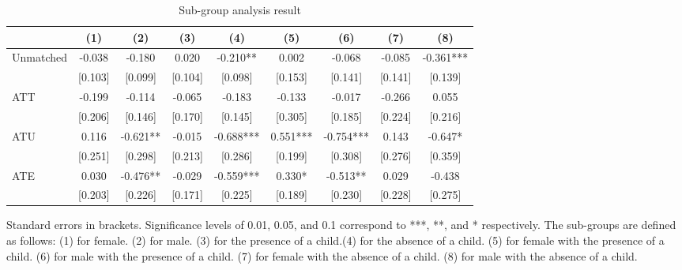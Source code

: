 \documentclass[12pt]{article}
\renewcommand{\arraystretch}{1.0} %
\begin{document}
\begin{table}[htbp]
\renewcommand{\arraystretch}{0.85}
  \setlength{\tabcolsep}{2mm}
  \centering
  \caption{Sub-group analysis result}
  \label{sub}
{\small

    \begin{tabular}{lcccccccc}
    \toprule
    & (1) & (2) & (3) & (4) & (5) & (6) & (7) & (8) \\ 
    \midrule \midrule
    Unmatched & -0.038 & -0.180 & 0.020 & -0.210** & 0.002 & -0.068 & -0.085 & -0.361*** \\ 
    & [0.103] & [0.099] & [0.104] & [0.098] & [0.153] & [0.141] & [0.141] & [0.139] \\ 
    \midrule
    ATT & -0.199 & -0.114 & -0.065 & -0.183 & -0.133 & -0.017 & -0.266 & 0.055 \\ 
    & [0.206] & [0.146] & [0.170] & [0.145] & [0.305] & [0.185] & [0.224] & [0.216] \\ 
    \midrule
    ATU & 0.116 & -0.621** & -0.015 & -0.688*** & 0.551*** & -0.754*** & 0.143 & -0.647* \\ 
    & [0.251] & [0.298] & [0.213] & [0.286] & [0.199] & [0.308] & [0.276] & [0.359] \\ 
    \midrule
    ATE & 0.030 & -0.476** & -0.029 & -0.559*** & 0.330* & -0.513** & 0.029 & -0.438 \\ 
    & [0.203] & [0.226] & [0.171] & [0.225] & [0.189] & [0.230] & [0.228] & [0.275] \\ 
    \bottomrule
    \end{tabular}
}
\end{table}
\vspace{-2em}
\begin{singlespace}
    \begin{footnotesize}
    	 Standard errors in brackets. Significance levels of 0.01, 0.05, and 0.1 correspond to ***, **, and * respectively. The sub-groups are defined as follows: 
     (1) for female. (2) for male. (3) for the presence of a child.(4) for the absence of a child. (5) for female with the presence of a child. (6) for male with the presence of a child. (7) for female with the absence of a child. (8) for male with the absence of a child.
    \end{footnotesize}
\end{singlespace}

\newpage
\end{document}
